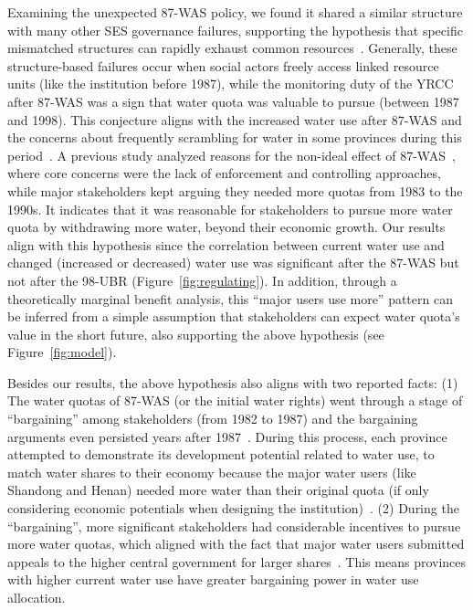 Examining the unexpected 87-WAS policy, we found it shared a similar structure with many other SES governance failures, supporting the hypothesis that specific mismatched structures can rapidly exhaust common resources~\cite{kellenberg2009,cai2016,barnes2019}.
Generally, these structure-based failures occur when social actors freely access linked resource units (like the institution before 1987), while the monitoring duty of the YRCC after 87-WAS was a sign that water quota was valuable to pursue (between 1987 and 1998).
This conjecture aligns with the increased water use after 87-WAS and the concerns about frequently scrambling for water in some provinces during this period~\cite{mao2000, bouckaert2022}.
A previous study analyzed reasons for the non-ideal effect of 87-WAS~\cite{huangang2002}, where core concerns were the lack of enforcement and controlling approaches, while major stakeholders kept arguing they needed more quotas from 1983 to the 1990s.
It indicates that it was reasonable for stakeholders to pursue more water quota by withdrawing more water, beyond their economic growth.
Our results align with this hypothesis since the correlation between current water use and changed (increased or decreased) water use was significant after the 87-WAS but not after the 98-UBR (Figure~\ref{fig:regulating}).
In addition, through a theoretically marginal benefit analysis, this ``major users use more'' pattern can be inferred from a simple assumption that stakeholders can expect water quota's value in the short future, also supporting the above hypothesis (see Figure~\ref{fig:model}).

Besides our results, the above hypothesis also aligns with two reported facts:
(1) The water quotas of 87-WAS (or the initial water rights) went through a stage of ``bargaining'' among stakeholders (from 1982 to 1987) and the bargaining arguments even persisted years after 1987~\cite{wang2019a, wang2019d}.
During this process, each province attempted to demonstrate its development potential related to water use, to match water shares to their economy because the major water users (like Shandong and Henan) needed more water than their original quota (if only considering economic potentials when designing the institution)~\cite{zuo2020}.
(2) During the ``bargaining'', more significant stakeholders had considerable
incentives to pursue more water quotas, which aligned with the fact that major water users submitted appeals to the higher central government for larger shares~\cite{wang2019a, wang2019d}.
This means provinces with higher current water use have greater bargaining power in water use allocation.

